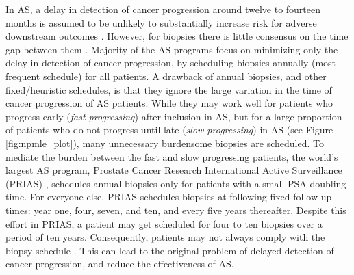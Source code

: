 In AS, a delay in detection of cancer progression around twelve to fourteen months is assumed to be unlikely to substantially increase risk for adverse downstream outcomes \cite{inoue2018comparative,carvalho}. However, for biopsies there is little consensus on the time gap between them \cite{loeb2014heterogeneity}. Majority of the AS programs focus on minimizing only the delay in detection of cancer progression, by scheduling biopsies annually (most frequent schedule) for all patients. A drawback of annual biopsies, and other fixed/heuristic schedules\cite{inoue2018comparative}, is that they ignore the large variation in the time of cancer progression of AS patients. While they may work well for patients who progress early (\textit{fast progressing}) after inclusion in AS, but for a large proportion of patients who do not progress until late (\textit{slow progressing}) in AS (see Figure \ref{fig:npmle_plot}), many unnecessary burdensome biopsies are scheduled. To mediate the burden between the fast and slow progressing patients, the world's largest AS program, Prostate Cancer Research International Active Surveillance (PRIAS) \cite{bokhorst2016decade}, schedules annual biopsies only for patients with a small PSA doubling time\cite{bokhorst2015compliance}. For everyone else, PRIAS schedules biopsies at following fixed follow-up times: year one, four, seven, and ten, and every five years thereafter. Despite this effort in PRIAS, a patient may get scheduled for four to ten biopsies over a period of ten years. Consequently, patients may not always comply with the biopsy schedule \cite{bokhorst2015compliance}. This can lead to the original problem of delayed detection of cancer progression, and reduce the effectiveness of AS.

